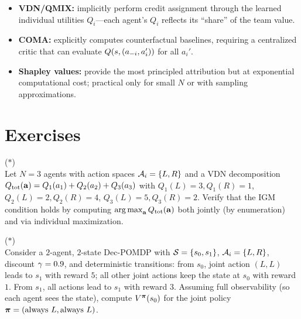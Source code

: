 \documentclass[11pt,a4paper]{article}
\begin{document}
\begin{rlconnection}[title={Credit Assignment in Practice}]
\begin{itemize}[nosep]
  \item \textbf{VDN/QMIX:} implicitly perform credit assignment
    through the learned individual utilities $Q_i$---each
    agent's $Q_i$ reflects its ``share'' of the team value.
  \item \textbf{COMA:} explicitly computes counterfactual
    baselines, requiring a centralized critic that can evaluate
    $Q(s, (a_{-i}, a_i'))$ for all $a_i'$.
  \item \textbf{Shapley values:} provide the most principled
    attribution but at exponential computational cost; practical
    only for small $N$ or with sampling approximations.
\end{itemize}
\end{rlconnection}

\section{Exercises}
\label{sec:exercises}

\begin{exercise}
\textnormal{(\(*\))} \\
Let $N = 3$ agents with action spaces $\mathcal{A}_i = \{L, R\}$ and
a VDN decomposition $Q_{\mathrm{tot}}(\mathbf{a}) = Q_1(a_1) + Q_2(a_2) +
Q_3(a_3)$ with $Q_1(L) = 3, Q_1(R) = 1$, $Q_2(L) = 2, Q_2(R) = 4$,
$Q_3(L) = 5, Q_3(R) = 2$.  Verify that the IGM condition holds by
computing $\operatorname{arg\,max}_{\mathbf{a}} Q_{\mathrm{tot}}(\mathbf{a})$ both jointly
(by enumeration) and via individual maximization.
\end{exercise}

\begin{exercise}
\textnormal{(\(*\))} \\
Consider a $2$-agent, $2$-state Dec-POMDP with $\mathcal{S} = \{s_0,
s_1\}$, $\mathcal{A}_i = \{L, R\}$, discount $\gamma = 0.9$,
and deterministic transitions: from $s_0$, joint action $(L, L)$
leads to $s_1$ with reward $5$; all other joint actions keep the
state at $s_0$ with reward $1$.  From $s_1$, all actions lead to
$s_1$ with reward $3$.  Assuming full observability (so each
agent sees the state), compute $V^{\boldsymbol{\pi}}(s_0)$ for the
joint policy $\boldsymbol{\pi} = (\text{always } L, \text{always } L)$.
\end{exercise}
\end{document}
